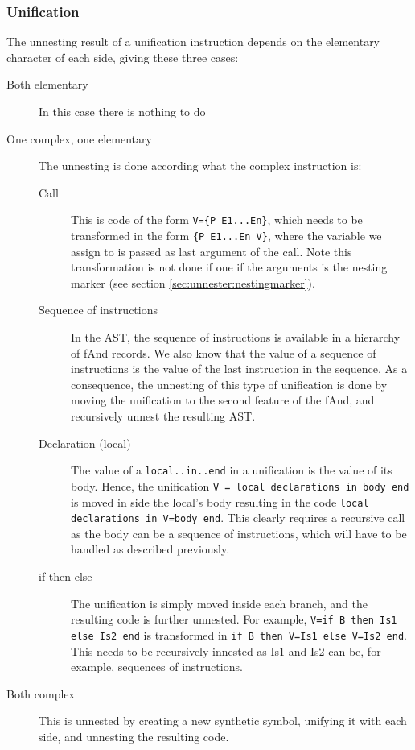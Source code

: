 \documentclass[a4paper]{memoir}
\begin{document}
\subsubsection{Unification}\label{sec:unnester:unification}
The unnesting result of a unification instruction depends on the elementary character of each side, giving these three cases:
\begin{description}
  \item[Both elementary]In this case there is nothing to do
  \item[One complex, one elementary] The unnesting is done according what the complex instruction is: 
    \begin{description}
      \item[Call] This is code of the form \lstinline!V={P E1...En}!, which needs to be transformed in the form \lstinline!{P E1...En V}!, where the variable we assign to is passed as last argument of the call. Note this transformation is not done if one if the arguments is the nesting marker (see section \ref{sec:unnester:nestingmarker}).
      \item[Sequence of instructions] In the AST, the sequence of instructions is available in a hierarchy of fAnd records. We also know that the value of a sequence of instructions is the value of the last instruction in the sequence. As a consequence, the unnesting of this type of unification is done by moving the unification to the second feature of the fAnd, and recursively unnest the resulting AST.
      \item[Declaration (local)] The value of a \lstinline!local..in..end! in a unification is the value of its body. Hence, the unification \lstinline!V = local declarations in body end! is moved in side the local's body resulting in the code \lstinline!local declarations in V=body end!. This clearly requires a recursive call as the body can be a sequence of instructions, which will have to be handled as described previously.
      \item[if then else] The unification is simply moved inside each branch, and the resulting code is further unnested. For example, \lstinline!V=if B then Is1 else Is2 end! is transformed in \lstinline!if B then V=Is1 else V=Is2 end!. This needs to be recursively innested as Is1 and Is2 can be, for example,  sequences of instructions.
    \end{description}
  \item[Both complex] This is unnested by creating a new synthetic symbol, unifying it with each side, and unnesting the resulting code.

\end{description}
\end{document}
